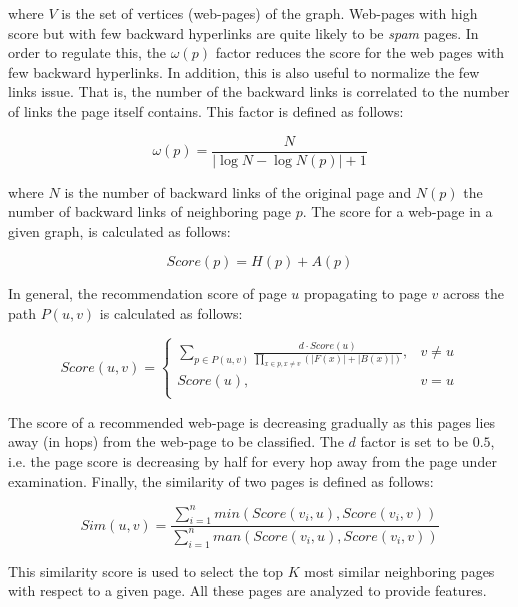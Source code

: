 \nointend where $V$ is the set of vertices (web-pages) of the graph. Web-pages with high score but with few backward hyperlinks are quite likely to be \textit{spam} pages. In order to regulate this, the $\omega(p)$ factor reduces the score for the web pages with few backward hyperlinks. In addition, this is also useful to normalize the few links issue. That is, the number of the backward links is correlated to the number of links the page itself contains. This factor is defined as follows:

\begin{equation}\label{eq:GenreSim_omega}
	\omega(p) = \frac{N}{|\log N - \log N(p) | + 1} 
\end{equation}

\nointend where $N$ is the number of backward links of the original page and $N(p)$ the number of backward links of neighboring page $p$. The score for a web-page in a given graph, is calculated as follows: 

\begin{equation}\label{eq:GenreSim_Score}
	Score(p) = H(p) + A(p)
\end{equation}

In general, the recommendation score of page $u$ propagating to page $v$ across the path $P(u,v)$ is calculated as follows:

\begin{equation}\label{eq:GenreSim_Path}
	Score(u, v) =
      \begin{cases}
		\sum_{p \in P(u, v)} \frac{d \cdot Score(u)}{\prod_{x \in p, x  \neq v} (|F(x)| +|B(x)|)}, & v \neq u \\
        Score(u), & v = u \\ 
       \end{cases}
\end{equation}

The score of a recommended web-page is decreasing gradually as this pages lies away (in hops) from the web-page to be classified. The $d$ factor is set to be $0.5$, i.e. the page score is decreasing by half for every hop away from the page under examination. Finally, the similarity of two pages is defined as follows:

\begin{equation}\label{eq:GenreSim_Selection_Score}
	Sim(u, v) = \frac{\sum_{i=1}^{n} min(Score(v_{i}, u), Score(v_{i}, v))}{\sum_{i=1}^{n} man(Score(v_{i}, u), Score(v_{i}, v))}
\end{equation}

This similarity score is used to select the top $K$ most similar neighboring pages with respect to a given page. All these pages are analyzed to provide features.


